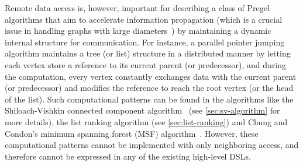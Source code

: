 \documentclass{sokendai_thesis} %
\begin{document}

Remote data access is, however, important for describing a class of Pregel algorithms that aim to accelerate information propagation (which is a crucial issue in handling graphs with large diameters~\cite{connectivity}) by maintaining a dynamic internal structure for communication.
For instance, a parallel pointer jumping algorithm maintains a tree (or list) structure in a distributed manner by letting each vertex store a reference to its current parent (or predecessor), and during the computation, every vertex constantly exchanges data with the current parent (or predecessor) and modifies the reference to reach the root vertex (or the head of the list).
Such computational patterns can be found in the algorithms like the Shiloach-Vishkin connected component algorithm~\cite{connectivity} (see \autoref{sec:sv-algorithm} for more details), the list ranking algorithm (see \autoref{sec:list-ranking}) and Chung and Condon's minimum spanning forest (MSF) algorithm~\cite{boruvka}.
However, these computational patterns cannot be implemented with only neighboring access, and therefore cannot be expressed in any of the existing high-level DSLs.
\end{document}

